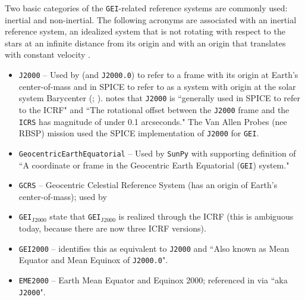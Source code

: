 \documentclass[draft]{agujournal2019}
\begin{document}
Two basic categories of the \texttt{GEI}-related reference systems are commonly used: inertial and non-inertial. The following acronyms are associated with an inertial reference system, an idealized system that is not rotating with respect to the stars at an infinite distance from its origin and with an origin that translates with constant velocity \cite{NAIFOverview2023}.

\begin{itemize}
    \parskip 0.1in 

    \item \texttt{J2000} -- Used by  (and \texttt{J2000.0}) to refer to a frame with its origin at Earth's center-of-mass and in SPICE to refer to as a system with origin at the solar system Barycenter (; ).  notes that \texttt{J2000} is ``generally used in SPICE to refer to the ICRF" and ``The rotational offset between the \texttt{J2000} frame and the \texttt{ICRS} has magnitude of under 0.1 arcseconds." The Van Allen Probes (nee RBSP) mission used the SPICE implementation of \texttt{J2000} for \texttt{GEI}.


    \item \texttt{GeocentricEarthEquatorial} -- Used by \texttt{SunPy} with supporting definition of ``A coordinate or frame in the Geocentric Earth Equatorial (\texttt{GEI}) system."
    
    \item \texttt{GCRS} -- Geocentric Celestial Reference System (has an origin of Earth's center-of-mass); used by 

    \item \texttt{GEI}$_\mathrm{J2000}$  state that \texttt{GEI}$_\mathrm{J2000}$ is realized through the ICRF (this is ambiguous today, because there are now three ICRF versions).

    \item \texttt{GEI2000} --  identifies this as equivalent to \texttt{J2000} and ``Also known as Mean Equator and Mean Equinox of \texttt{J2000.0}". 

    \item \texttt{EME2000} -- Earth Mean Equator and Equinox 2000; referenced in  via ``aka \texttt{J2000}".


\end{itemize}
\end{document}
